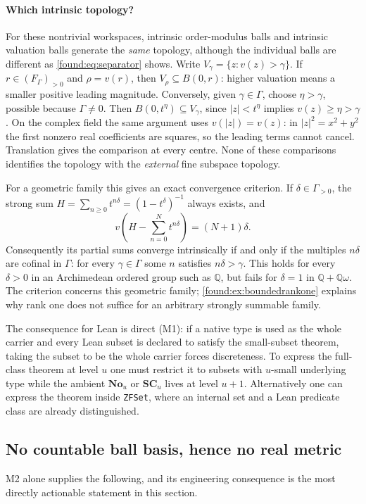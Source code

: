 \documentclass[11pt,letterpaper]{article}
\numberwithin{equation}{section}
\theoremstyle{definition}
\theoremstyle{remark}
\newcommand{\No}{\mathbf{No}}
\newcommand{\SC}{\mathbf{SC}}
\newcommand{\Q}{\mathbb Q}
\begin{document}
\paragraph{Which intrinsic topology?}
For these nontrivial workspaces, intrinsic order-modulus balls and intrinsic
valuation balls generate the \emph{same} topology, although the individual
balls are different as \cref{found:eq:separator} shows. Write
$V_\gamma=\{z:v(z)>\gamma\}$. If $r\in(F_\Gamma)_{>0}$ and
$\rho=v(r)$, then $V_\rho\subseteq B(0,r)$: higher valuation means a smaller
positive leading magnitude. Conversely, given $\gamma\in\Gamma$, choose
$\eta>\gamma$, possible because $\Gamma\ne0$. Then
$B(0,t^\eta)\subseteq V_\gamma$, since $|z|<t^\eta$ implies
$v(z)\ge\eta>\gamma$. On the complex field the same argument uses
$v(|z|)=v(z)$: in $|z|^2=x^2+y^2$ the first nonzero real coefficients are
squares, so the leading terms cannot cancel. Translation gives the comparison
at every centre. None of these comparisons identifies the topology with the
\emph{external} fine subspace topology.

For a geometric family this gives an exact convergence criterion. If
$\delta\in\Gamma_{>0}$, the strong sum
$H=\sum_{n\ge0}t^{n\delta}=(1-t^\delta)^{-1}$ always exists, and
\[
 v\!\left(H-\sum_{n=0}^N t^{n\delta}\right)=(N+1)\delta.
\]
Consequently its partial sums converge intrinsically if and only if the
multiples $n\delta$ are cofinal in $\Gamma$: for every $\gamma\in\Gamma$
some $n$ satisfies $n\delta>\gamma$. This holds for every $\delta>0$ in an
Archimedean ordered group such as $\Q$, but fails for $\delta=1$ in
$\Q+\Q\omega$. The criterion concerns this geometric family;
\cref{found:ex:boundedrankone} explains why rank one does not suffice for an
arbitrary strongly summable family.

The consequence for Lean is direct (M1): if a native type is used as the whole
carrier and every Lean subset is declared to satisfy the small-subset theorem,
taking the subset to be the whole carrier forces discreteness. To express the
full-class theorem at level $u$ one must restrict it to subsets with $u$-small
underlying type while the ambient $\No_u$ or $\SC_u$ lives at level $u+1$.
Alternatively one can express the theorem inside \texttt{ZFSet}, where an
internal set and a Lean predicate class are already distinguished.

\subsection{No countable ball basis, hence no real metric}
\label{found:sub:nometric}
M2 alone supplies the following, and its engineering consequence is the most
directly actionable statement in this section.
\end{document}
